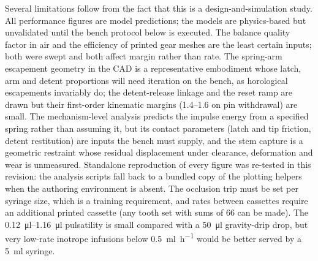 \documentclass[11pt,a4paper]{article}
\begin{document}
Several limitations follow from the fact that this is a design-and-simulation study. All performance figures are model predictions; the models are physics-based but unvalidated until the bench protocol below is executed. The balance quality factor in air and the efficiency of printed gear meshes are the least certain inputs; both were swept and both affect margin rather than rate. The spring-arm escapement geometry in the CAD is a representative embodiment whose latch, arm and detent proportions will need iteration on the bench, as horological escapements invariably do; the detent-release linkage and the reset ramp are drawn but their first-order kinematic margins (1.4--1.6 on pin withdrawal) are small. The mechanism-level analysis predicts the impulse energy from a specified spring rather than assuming it, but its contact parameters (latch and tip friction, detent restitution) are inputs the bench must supply, and the stem capture is a geometric restraint whose residual displacement under clearance, deformation and wear is unmeasured. Standalone reproduction of every figure was re-tested in this revision: the analysis scripts fall back to a bundled copy of the plotting helpers when the authoring environment is absent. The occlusion trip must be set per syringe size, which is a training requirement, and rates between cassettes require an additional printed cassette (any tooth set with sums of 66 can be made). The \SIrange{0.12}{1.16}{\micro\litre} pulsatility is small compared with a \SI{50}{\micro\litre} gravity-drip drop, but very low-rate inotrope infusions below \SI{0.5}{\milli\litre\per\hour} would be better served by a \SI{5}{\milli\litre} syringe.
\end{document}
